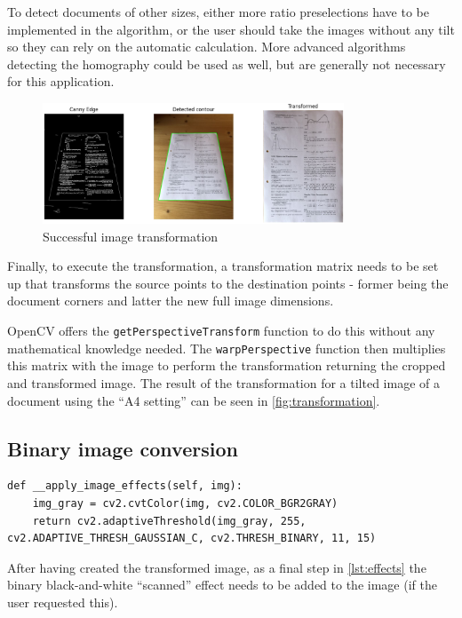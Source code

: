 To detect documents of other sizes, either more ratio preselections have to be implemented in the algorithm, or the user should take the images without any tilt so they can rely on the automatic calculation. More advanced algorithms detecting the homography could be used as well, but are generally not necessary for this application.

\begin{figure}[h]
    \includegraphics[width=0.8\textwidth]{figures/transformation_tilt.jpg}
    \centering
    \caption{Successful image transformation}
    \label{fig:transformation}
\end{figure}

Finally, to execute the transformation, a transformation matrix needs to be set up that transforms the source points to the destination points - former being the document corners and latter the new full image dimensions.

OpenCV offers the \texttt{getPerspectiveTransform} function to do this without any mathematical knowledge needed. The \texttt{warpPerspective} function then multiplies this matrix with the image to perform the transformation returning the cropped and transformed image. The result of the transformation for a tilted image of a document using the \enquote{A4 setting} can be seen in \autoref{fig:transformation}.

\subsection{Binary image conversion}
\begin{lstlisting}[caption={Image effects method}, label={lst:effects}, float]
def __apply_image_effects(self, img):
    img_gray = cv2.cvtColor(img, cv2.COLOR_BGR2GRAY)
    return cv2.adaptiveThreshold(img_gray, 255, cv2.ADAPTIVE_THRESH_GAUSSIAN_C, cv2.THRESH_BINARY, 11, 15)
\end{lstlisting}

After having created the transformed image, as a final step in \autoref{lst:effects} the binary black-and-white \enquote{scanned} effect needs to be added to the image (if the user requested this).


